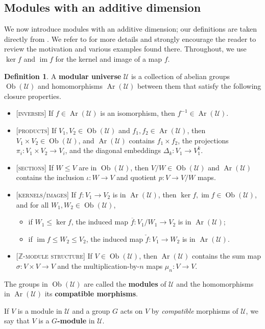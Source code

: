 \documentclass[a4paper, 11pt]{amsart}
\theoremstyle{plain}
\theoremstyle{definition}
\newtheorem{definition}[theorem]{Definition}
\theoremstyle{remark}
\newcommand{\cU}{\mathcal{U}}
\DeclareMathOperator{\Ar}{Ar}
\DeclareMathOperator{\Ob}{Ob}
\DeclareMathOperator{\im}{im}
\newcommand{\bZ}{\mathbb{Z}}
\begin{document}
\subsection{Modules with an additive dimension}\label{s.ModAddDim}
We now introduce modules with an additive dimension; our definitions are taken directly from \cite{CDW23}. We refer  to \cite[Section 2]{CDW23} for more details and strongly encourage the reader to review the motivation and various examples found there. Throughout, we use $\ker f$ and $\im f$ for the kernel and image of a map $f$.

\begin{definition}
A \textbf{modular universe} $\cU$ is a collection of abelian groups $\Ob(\cU)$ and homomorphisms $\Ar(\cU)$ between them  that satisfy the following closure properties.
\begin{itemize}
\item{}[\textsc{inverses}]
If $f \in \Ar(\cU)$ is an isomorphism, then $f^{-1} \in \Ar(\cU)$.
\item{}[\textsc{products}] If $V_1, V_2 \in \Ob(\cU)$ and $f_1, f_2 \in \Ar(\cU)$, then 
$V_1 \times V_2 \in \Ob(\cU)$, and 
	$\Ar(\cU)$ contains $f_1 \times f_2$,  the projections $\pi_i : V_1\times V_2 \rightarrow V_i$, and the diagonal embeddings $\Delta_k:V_1\rightarrow V_1^k$.
\item{}[\textsc{sections}] 
If $W \leq V$ are in $\Ob(\cU)$, then $V/W\in \Ob(\cU)$ and $\Ar(\cU)$ contains the inclusion $\iota:W\rightarrow V$ and quotient $p:V\rightarrow V/W$ maps.
\item{}[\textsc{kernels/images}] 
If $f:V_1 \rightarrow V_2$ is in $\Ar(\cU)$, then $\ker f, \im f \in \Ob(\cU)$, and for all $W_1,W_2 \in \Ob(\cU)$,
	\begin{itemize} 
	\item
	if $W_1 \leq \ker f$, the induced map $\overline{f}\colon V_1/W_1 \to V_2$ is in $\Ar(\cU)$;
	\item 
	if $\im f \le W_2 \le V_2$,  the induced map $\check{f}\colon V_1 \to W_2$ is in $\Ar(\cU)$.
	\end{itemize} 
\item{}[$\bZ$-\textsc{module structure}]
If $V \in \Ob(\cU)$, then $\Ar(\cU)$ contains the sum  map $\sigma \colon V\times V \to V$ and the multiplication-by-$n$  maps $\mu_n\colon V \to V$.
\end{itemize}
The groups in $\Ob(\cU)$ are called the \textbf{modules} of $\cU$ and the homomorphisms in $\Ar(\cU)$ its \textbf{compatible morphisms}.

If $V$ is a module in  $\cU$ and a group $G$ acts on $V$ by \emph{compatible} morphisms of $\cU$, we say that $V$ is a \textbf{$G$-module} in $\cU$.
\end{definition}
\end{document}
